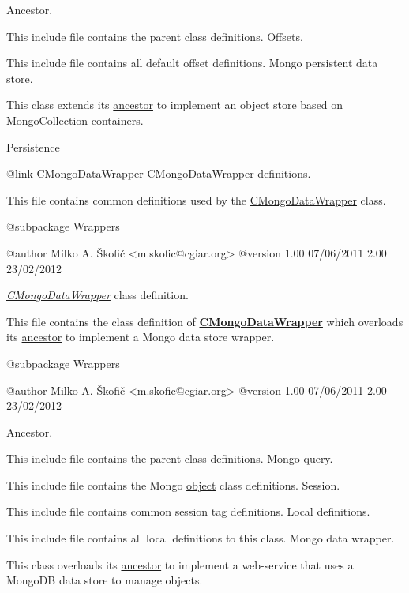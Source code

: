 Ancestor.

This include file contains the parent class definitions. Offsets.

This include file contains all default offset definitions. Mongo persistent data store.

This class extends its \hyperlink{class_c_container}{ancestor} to implement an object store based on Mongo\-Collection containers.

Persistence

\begin{DoxyVerb}   {@link CMongoDataWrapper CMongoDataWrapper} definitions.\end{DoxyVerb}
 This file contains common definitions used by the \hyperlink{class_c_mongo_data_wrapper}{C\-Mongo\-Data\-Wrapper} class.

\begin{DoxyVerb}    @subpackage     Wrappers

    @author         Milko A. Škofič <m.skofic@cgiar.org>
    @version        1.00 07/06/2011
                            2.00 23/02/2012\end{DoxyVerb}


{\itshape \hyperlink{class_c_mongo_data_wrapper}{C\-Mongo\-Data\-Wrapper}\/} class definition.

This file contains the class definition of {\bfseries \hyperlink{class_c_mongo_data_wrapper}{C\-Mongo\-Data\-Wrapper}} which overloads its \hyperlink{class_c_data_wrapper}{ancestor} to implement a Mongo data store wrapper.

\begin{DoxyVerb}    @subpackage     Wrappers

    @author         Milko A. Škofič <m.skofic@cgiar.org>
    @version        1.00 07/06/2011
                            2.00 23/02/2012\end{DoxyVerb}


Ancestor.

This include file contains the parent class definitions. Mongo query.

This include file contains the Mongo \hyperlink{class_c_mongo_query}{object} class definitions. Session.

This include file contains common session tag definitions. Local definitions.

This include file contains all local definitions to this class. Mongo data wrapper.

This class overloads its \hyperlink{class_c_data_wrapper}{ancestor} to implement a web-\/service that uses a Mongo\-D\-B data store to manage objects.

